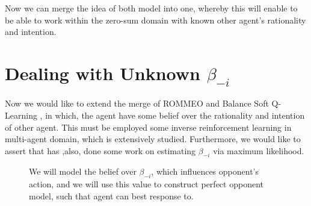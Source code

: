 Now we can merge the idea of both model into one, whereby this will enable \cite{tian2019regularized} to be able to work within the zero-sum domain with known other agent's rationality and intention.

\section{Dealing with Unknown $\beta_{-i}$}
Now we would like to extend the merge of ROMMEO \cite{tian2019regularized} and Balance Soft Q-Learning \cite{grau2018balancing}, in which, the agent have some belief over the rationality and intention of other agent. This must be employed some inverse reinforcement learning in multi-agent domain, which is extensively studied. Furthermore, we would like to assert that  \cite{grau2018balancing} has ,also, done some work on estimating $\beta_{-i}$ via maximum likelihood.

\begin{figure}[ht]
    \begin{minipage}[t]{0.5\linewidth}
    \centering
    \label{Balancing-Graphical}
    \end{minipage}%
    \begin{minipage}[t]{0.5\linewidth}
    We will model the belief over $\beta_{-i}$, which influences opponent's action, and we will use this value to construct perfect opponent model, such that agent can best response to. 
    \end{minipage}
\end{figure}

